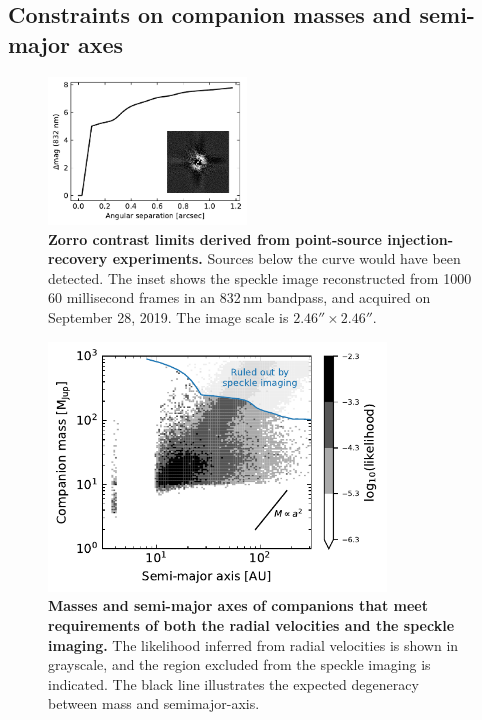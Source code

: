 \documentclass[12pt,twocolumn,tighten]{aastex62}
\begin{document}
\subsection{Constraints on companion masses and semi-major axes}

\begin{figure}[!t]
	\begin{center}
		\leavevmode
		\includegraphics[width=0.47\textwidth]{f3.pdf}
	\end{center}
	\vspace{-0.7cm}
    \caption{
      {\bf Zorro contrast limits derived from point-source
      injection-recovery experiments.} Sources below the curve would
      have been detected.  The inset shows the speckle image
      reconstructed from 1000 60 millisecond frames in an 832$\,$nm
      bandpass, and acquired on September 28, 2019.  The image scale
      is $2.46''\times2.46''$.
    }
    \label{fig:zorro}
\end{figure}

\begin{figure}[t]
	\begin{center}
		\leavevmode
		\includegraphics[width=0.8\textwidth]{f4.pdf}
	\end{center}
	\vspace{-0.8cm}
	\caption{
    {\bf Masses and semi-major axes of companions that meet
    requirements of both the radial velocities and the speckle
    imaging.} The likelihood inferred from radial velocities is shown
    in grayscale, and the region excluded from the speckle imaging is
    indicated.  The black line illustrates the expected degeneracy
    between mass and semimajor-axis.
	\label{fig:mass_sma}
  \vspace{-0cm}
	}
\end{figure}
\end{document}
